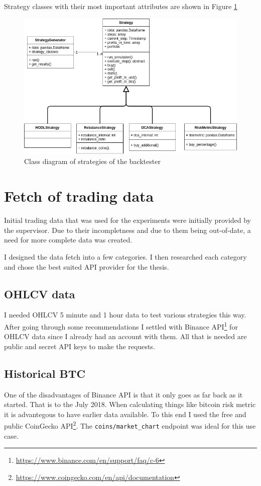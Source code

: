Strategy classes with their most important attributes are shown in Figure \ref{figure-strategy-class-diagram}

\begin{figure}[ht]
    \centering
    \includegraphics[width=\columnwidth]{figures/strategy-class-diagram.png}
    \caption{Class diagram of strategies of the backtester}
    \label{figure-strategy-class-diagram}
\end{figure}


\section{Fetch of trading data}
Initial trading data that was used for the experiments were initially provided by the supervisor. Due to their incompletness and due to them being out-of-date, a need for more complete data was created.

I designed the data fetch into a few categories. I then researched each category and chose the best suited API provider for the thesis.

\subsection*{OHLCV data}
I needed OHLCV 5 minute and 1 hour data to test various strategies this way. After going through some recommendations I settled with Binance API\footnote{\url{https://www.binance.com/en/support/faq/c-6}} for OHLCV data since I already had an account with them. All that is needed are public and secret API keys to make the requests.

\subsection*{Historical BTC}
One of the disadvantages of Binance API is that it only goes as far back as it started. That is to the July 2018. When calculating things like bitcoin risk metric it is advantegous to have earlier data available. To this end I used the free and public CoinGecko API\footnote{\url{https://www.coingecko.com/en/api/documentation}}. The \texttt{coins/market\_chart} endpoint was ideal for this use case.

